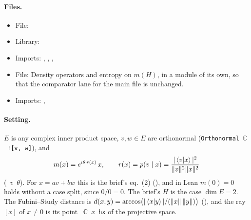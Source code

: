 \documentclass[11pt]{article}
\begin{document}
\paragraph{Files.}\leavevmode
\begin{itemize}
\item File: 
\item Library: 
\item Imports: ,\newline
  ,\newline
  ,\newline
\item File: \newline
  Density operators and entropy on $m(H)$, in a module of its own, so that the comparator lane
  for the main file is unchanged.
\item Imports: ,\newline
\end{itemize}

\paragraph{Setting.} $E$ is any complex inner product space, $v, w \in E$ are orthonormal
(\texttt{Orthonormal}~$\mathbb{C}$~\texttt{![v, w]}), and
\[
  m(x) = e^{\imath\theta\, r(x)}\, x, \qquad r(x) = p(v\mid x) =
  \frac{|\braket{v|x}|^2}{\|v\|^2\|x\|^2}
\]
(~$v$~$\theta$). For $x = av + bw$ this is the brief's eq.~(2)
(), and in Lean $m(0) = 0$ holds without a case split, since
$0/0 = 0$. The brief's $H$ is the case $\dim E = 2$. The Fubini--Study distance is
$d(x, y) = \arccos\bigl(|\braket{x|y}| / (\|x\|\,\|y\|)\bigr)$ (), and the ray
$[x]$ of $x \ne 0$ is its point ~$\mathbb{C}$~$x$~\texttt{hx} of the projective space.
\end{document}
